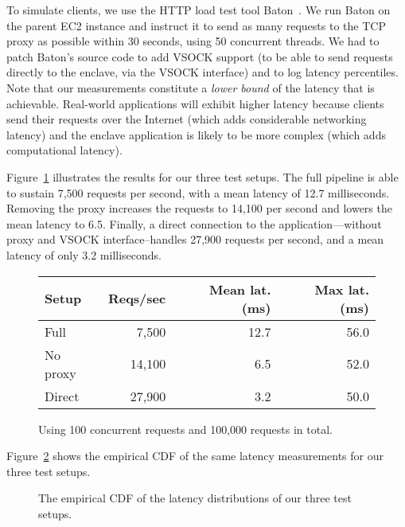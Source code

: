 To simulate clients, we use the HTTP load test tool Baton~\cite{baton}.  We run
Baton on the parent EC2 instance and instruct it to send as many requests to the
TCP proxy as possible within 30 seconds, using 50 concurrent threads.  We had to
patch Baton's source code to add VSOCK support (to be able to send requests
directly to the enclave, via the VSOCK interface) and to log latency
percentiles.  Note that our measurements constitute a \emph{lower bound} of the
latency that is achievable.  Real-world applications will exhibit higher latency
because clients send their requests over the Internet (which adds considerable
networking latency) and the enclave application is likely to be more complex
(which adds computational latency).

Figure~\ref{fig:latency-msmts} illustrates the results for our three test
setups.  The full pipeline is able to sustain 7,500 requests per second, with a
mean latency of 12.7 milliseconds.  Removing the proxy increases the requests
to 14,100 per second and lowers the mean latency to 6.5.  Finally, a direct
connection to the application---without proxy and VSOCK interface--handles
27,900 requests per second, and a mean latency of only 3.2 milliseconds.

\begin{figure}[t]
    \centering
    \begin{tabular}{l r r r}
    \toprule
      Setup & Reqs/sec & Mean lat. (ms) & Max lat. (ms) \\
    \midrule
    Full & 7,500 & 12.7 & 56.0 \\
    No proxy & 14,100 & 6.5 & 52.0 \\
    Direct & 27,900 & 3.2 & 50.0 \\
    \bottomrule
    \end{tabular}
    \caption{Using 100 concurrent requests and 100,000 requests in total.}
    \label{fig:latency-msmts}
\end{figure}

Figure~\ref{fig:latency-cdf} shows the empirical CDF of the same latency
measurements for our three test setups.

\begin{figure}[t]
    \centering
    
    \label{fig:latency-cdf}
    \caption{The empirical CDF of the latency distributions of our three test setups.}
\end{figure}



